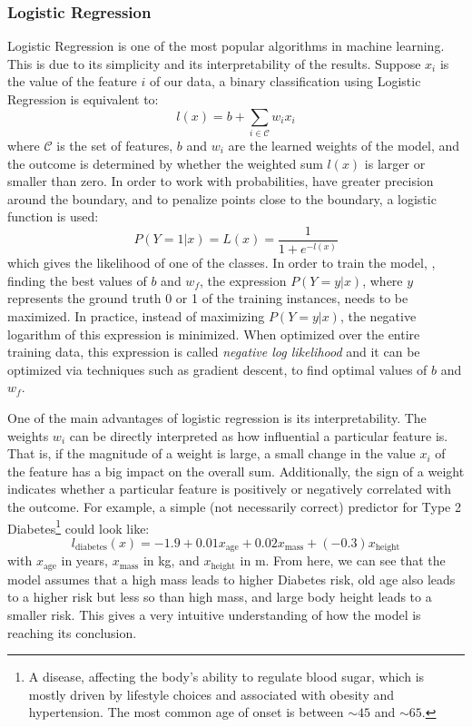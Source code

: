 \subsubsection{Logistic Regression}
Logistic Regression \cite{mlbook} is one of the most popular algorithms in machine learning.
This is due to its simplicity and its interpretability of the results.
Suppose $x_i$ is the value of the feature $i$ of our data, a binary classification using Logistic Regression is equivalent to:
\[
l(x) = b + \sum_{i \in \mathcal{C}} w_i x_i
\]
where $\mathcal{C}$ is the set of features, $b$ and $w_i$ are the learned weights of the model, and the outcome is determined by whether the weighted sum $l(x)$ is larger or smaller than zero.
In order to work with probabilities, have greater precision around the boundary, and to penalize points close to the boundary, a logistic function is used:
\[
P(Y=1 | x) = L(x) = \frac{1}{1 + e^{-l(x)}}
\]
which gives the likelihood of one of the classes.
In order to train the model, \ie, finding the best values of $b$ and $w_f$, the expression $P(Y=y | x)$, where $y$ represents the ground truth 0 or 1 of the training instances, needs to be maximized.
In practice, instead of maximizing $P(Y=y|x)$, the negative logarithm of this expression is minimized.
When optimized over the entire training data, this expression is called \emph{negative log likelihood} and it can be optimized via techniques such as gradient descent, to find optimal values of $b$ and $w_f$.

One of the main advantages of logistic regression is its interpretability.
The weights $w_i$ can be directly interpreted as how influential a particular feature is.
That is, if the magnitude of a weight is large, a small change in the value $x_i$ of the feature has a big impact on the overall sum.
Additionally, the sign of a weight indicates whether a particular feature is positively or negatively correlated with the outcome.
For example, a simple (not necessarily correct) predictor for Type 2 Diabetes\footnote{A disease, affecting the body's ability to regulate blood sugar, which is mostly driven by lifestyle choices and associated with obesity and hypertension. The most common age of onset is between ${\sim}45$ and ${\sim}65$.} could look like:
\[
l_\text{diabetes}(x) = -1.9 + 0.01 x_\text{age} + 0.02 x_\text{mass} + (-0.3) x_\text{height}
\]
with $x_\text{age}$ in years, $x_\text{mass}$ in \si{kg}, and $x_\text{height}$ in \si{m}.
From here, we can see that the model assumes that a high mass leads to higher Diabetes risk, old age also leads to a higher risk but less so than high mass, and large body height leads to a smaller risk.
This gives a very intuitive understanding of how the model is reaching its conclusion.


